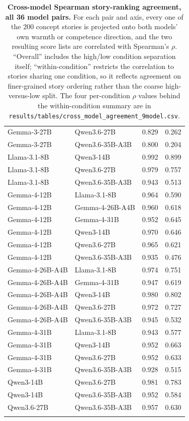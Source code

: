 \begin{longtable}{@{}llrr@{}}
Gemma-3-27B & Qwen3.6-27B & 0.829 & 0.262 \\
Gemma-3-27B & Qwen3.6-35B-A3B & 0.800 & 0.204 \\
Llama-3.1-8B & Qwen3-14B & 0.992 & 0.899 \\
Llama-3.1-8B & Qwen3.6-27B & 0.979 & 0.757 \\
Llama-3.1-8B & Qwen3.6-35B-A3B & 0.943 & 0.513 \\
Gemma-4-12B & Llama-3.1-8B & 0.964 & 0.590 \\
Gemma-4-12B & Gemma-4-26B-A4B & 0.960 & 0.618 \\
Gemma-4-12B & Gemma-4-31B & 0.952 & 0.645 \\
Gemma-4-12B & Qwen3-14B & 0.970 & 0.646 \\
Gemma-4-12B & Qwen3.6-27B & 0.965 & 0.621 \\
Gemma-4-12B & Qwen3.6-35B-A3B & 0.935 & 0.476 \\
Gemma-4-26B-A4B & Llama-3.1-8B & 0.974 & 0.751 \\
Gemma-4-26B-A4B & Gemma-4-31B & 0.947 & 0.619 \\
Gemma-4-26B-A4B & Qwen3-14B & 0.980 & 0.802 \\
Gemma-4-26B-A4B & Qwen3.6-27B & 0.972 & 0.727 \\
Gemma-4-26B-A4B & Qwen3.6-35B-A3B & 0.945 & 0.532 \\
Gemma-4-31B & Llama-3.1-8B & 0.943 & 0.577 \\
Gemma-4-31B & Qwen3-14B & 0.952 & 0.663 \\
Gemma-4-31B & Qwen3.6-27B & 0.952 & 0.633 \\
Gemma-4-31B & Qwen3.6-35B-A3B & 0.928 & 0.515 \\
Qwen3-14B & Qwen3.6-27B & 0.981 & 0.783 \\
Qwen3-14B & Qwen3.6-35B-A3B & 0.952 & 0.584 \\
Qwen3.6-27B & Qwen3.6-35B-A3B & 0.957 & 0.630 \\
\addlinespace
\caption{\textbf{Cross-model Spearman story-ranking agreement, all 36 model pairs.} For each pair and axis, every one of the 200 concept stories is projected onto both models' own warmth or competence direction, and the two resulting score lists are correlated with Spearman's $\rho$. ``Overall'' includes the high/low condition separation itself; ``within-condition'' restricts the correlation to stories sharing one condition, so it reflects agreement on finer-grained story ordering rather than the coarse high-versus-low split. The four per-condition $\rho$ values behind the within-condition summary are in \texttt{results/tables/cross\_model\_agreement\_9model.csv}.}
\label{tab:cross_model_agreement} \\
\end{longtable}
\endgroup

